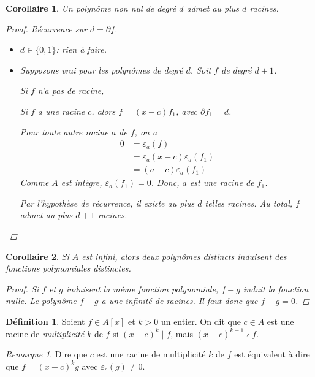 \documentclass{report}
\newtheorem*{coro}{Corollaire}
\theoremstyle{definition}
\newtheorem*{dfn}{D\'efinition}
\theoremstyle{remark}
\newtheorem*{rmq}{Remarque}
\begin{document}
	\begin{coro}
		Un polyn\^ome non nul de degr\'e $d$ admet au plus $d$ racines.
		\begin{proof}
			R\'ecurrence sur $d=\partial f$.
			\begin{itemize}
				\item $d\in\{0,1\}$: rien \`a faire.
				\item Supposons vrai pour les polyn\^omes de degr\'e $d$. Soit $f$ de degr\'e $d+1$.

				Si $f$ n'a pas de racine, \checkmark

				Si $f$ a une racine $c$, alors $f=(x-c)f_1$, avec $\partial f_1=d$.

				Pour toute autre racine $a$ de $f$, on a
				\begin{align*}
					0&= \varepsilon_a(f)\\
					&= \varepsilon_a(x-c) \varepsilon_a(f_1)\\
					&= (a-c) \varepsilon_a(f_1)
				\end{align*}
				Comme $A$ est int\`egre, $\varepsilon_a(f_1)=0$. Donc, $a$ est une racine de $f_1$.

				Par l'hypoth\`ese de r\'ecurrence, il existe au plus $d$ telles racines. Au total, $f$ admet au plus $d+1$ racines.
			\end{itemize}
		\end{proof}
	\end{coro}

	\begin{coro}
		Si $A$ est infini, alors deux polyn\^omes distincts induisent des fonctions polynomiales distinctes.
		\begin{proof}
			Si $f$ et $g$ induisent la m\^eme fonction polynomiale, $f-g$ induit la fonction nulle. Le polyn\^ome $f-g$ a une infinit\'e de racines. Il faut donc que $f-g=0$.
		\end{proof}
	\end{coro}

	\begin{dfn}
		Soient $f\in A[x]$ et $k>0$ un entier. On dit que $c\in A$ est une racine de \emph{multiplicit\'e} $k$ de $f$ si $(x-c)^k \mid f$, mais $(x-c)^{k+1} \nmid f$.
	\end{dfn}

	\begin{rmq}
		Dire que $c$ est une racine de multiplicit\'e $k$ de $f$ est \'equivalent \`a dire que $f=(x-c)^kg$ avec $\varepsilon_c(g)\neq0$.
	\end{rmq}
\end{document}
